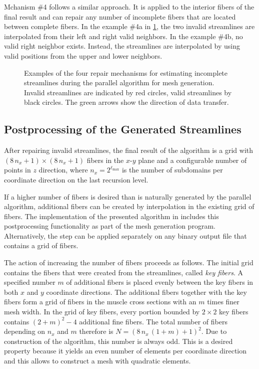 Mchanism \#4 follows a similar approach. It is applied to the interior fibers of the final result and can repair any number of incomplete fibers that are located between complete fibers. In the example \#4a in \cref{fig:fix_invalid}, the two invalid streamlines are interpolated from their left and right valid neighbors. In the example \#4b, no valid right neighbor exists. Instead, the streamlines are interpolated by using valid positions from the upper and lower neighbors.

\begin{figure}%
  \centering%
  \def\svgwidth{0.8\textwidth}
  
  \caption{Examples of the four repair mechanisms for estimating incomplete streamlines during the parallel algorithm for mesh generation. Invalid streamlines are indicated by red circles, valid streamlines by black circles. The green arrows show the direction of data transfer.}%
  \label{fig:fix_invalid}%
\end{figure}%

\subsection{Postprocessing of the Generated Streamlines}

After repairing invalid streamlines, the final result of the algorithm is a grid with $(8\,n_x+1) \times (8\,n_x+1)$ fibers in the $x$-$y$ plane and a configurable number of points in $z$ direction, where $n_x = 2^{\ell_\text{max}}$ is the number of subdomains per coordinate direction on the last recursion level. 

If a higher number of fibers is desired than is naturally generated by the parallel algorithm, additional fibers can be created by interpolation in the existing grid of fibers. The implementation of the presented algorithm in \opendihu{} includes this postprocessing functionality as part of the mesh generation program. Alternatively, the step can be applied separately on any binary output file that contains a grid of fibers. 

The action of increasing the number of fibers proceeds as follows. The initial grid contains the fibers that were created from the streamlines, called \emph{key fibers}.
A specified number $m$ of additional fibers is placed evenly between the key fibers in both $x$ and $y$ coordinate directions.
The additional fibers together with the key fibers form a grid of fibers in the muscle cross sections with an $m$ times finer mesh width. In the grid of key fibers, every portion bounded by $2 \times 2$ key fibers contains $(2+m)^2 - 4$ additional fine fibers. The total number of fibers depending on $n_x$ and $m$ therefore is $N=(8\,n_x\,(1+m)+1)^2$. Due to construction of the algorithm, this number is always odd. This is a desired property because it yields an even number of elements per coordinate direction and this allows to construct a mesh with quadratic elements.

